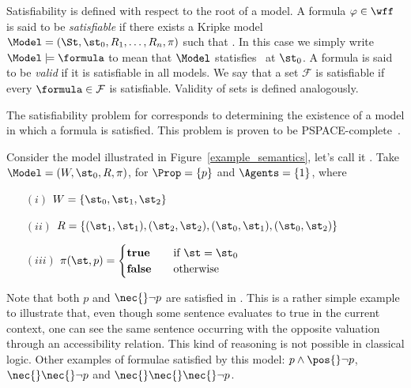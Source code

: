 Satisfiability is defined with respect to the root of a model. A formula $\varphi
\in \wff$ is said to be \emph{satisfiable} if there exists a Kripke model
$\Model = (\St, \st_0, R_1, \ldots, R_n, \pi)$ such that
. In this case we simply write $\Model \models
\formula$ to mean that $\Model$ statisfies \formula~at $\st_0$. A formula is said to be \emph{valid} if it is
satisfiable in all models. We say that a set $\mathcal{F}$ is satisfiable if
every $\formula \in \mathcal{F}$ is satisfiable. Validity of sets is defined
analogously. 

The satisfiability problem for  corresponds to determining the
existence of a model in which a formula is satisfied. This problem is proven to be
PSPACE-complete~\cite{Spaan:coml}.

\begin{example}
    Consider the model illustrated in Figure~\ref{example_semantics}, let's call
    it \Model. Take $\Model = (W, \st_0, R, \pi)$, for $\Prop = \{p\}$ and
    $\Agents = \{1\}$, where 
    \begin{enumerate}
        \item[$(i)$] $W = \{\st_0, \st_1, \st_2\}$
        \item[$(ii)$] $R = \{(\st_1, \st_1), (\st_2, \st_2),
            (\st_0, \st_1), (\st_0, \st_2)\}$
        \item[$(iii)$] $ \pi(\st, p) = 
            \begin{cases} 
                \text{\textbf{true}}    & \quad \text{if } \st = \st_0\\
                \text{\textbf{false}}   & \quad \text{otherwise}
            \end{cases}
                       $
    \end{enumerate}

    Note that both $p$ and $\nec{} \neg p$ are satisfied in \Model. This is a
    rather simple example to illustrate that, even though some sentence
    evaluates to true in the current context, one can see the same sentence
    occurring with the opposite valuation through an accessibility relation.
    This kind of reasoning is not possible in classical logic. Other examples of
    formulae satisfied by this model: $p \land \pos{} \neg p$, $\nec{}\nec{}
    \neg p$ and $\nec{} \nec {} \nec{} \neg p$.
\end{example}



